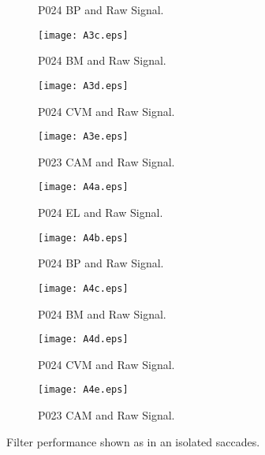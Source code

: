 \documentclass[transmag]{IEEEtran}
\begin{document}
\begin{sidewaysfigure*}
\begin{subfigure}[b]{0.18\textwidth}
		\caption{P024 BP and Raw Signal.}
	\end{subfigure}
	\begin{subfigure}[b]{0.18\textwidth}
		\texttt{[image: A3c.eps]}
		\caption{P024 BM and Raw Signal.}
	\end{subfigure}
	\begin{subfigure}[b]{0.18\textwidth}
		\texttt{[image: A3d.eps]}
		\caption{P024 CVM and Raw Signal.}
	\end{subfigure}
	\begin{subfigure}[b]{0.18\textwidth}
	\texttt{[image: A3e.eps]}
	\caption{P023 CAM and Raw Signal.}
	\end{subfigure}
	\hfill
	\begin{subfigure}[b]{0.18\textwidth}
		\texttt{[image: A4a.eps]}
		\caption{P024 EL and Raw Signal.}
	\end{subfigure}
	\begin{subfigure}[b]{0.18\textwidth}
		\texttt{[image: A4b.eps]}
		\caption{P024 BP and Raw Signal.}
	\end{subfigure}
	\begin{subfigure}[b]{0.18\textwidth}
		\texttt{[image: A4c.eps]}
		\caption{P024 BM and Raw Signal.}
	\end{subfigure}
	\begin{subfigure}[b]{0.18\textwidth}
		\texttt{[image: A4d.eps]}
		\caption{P024 CVM and Raw Signal.}
	\end{subfigure}
	\begin{subfigure}[b]{0.18\textwidth}
	\texttt{[image: A4e.eps]}
	\caption{P023 CAM and Raw Signal.}
	\end{subfigure}
	\hfill
	\caption{Filter performance shown as in an isolated saccades.}
	\label{fig10}
\end{sidewaysfigure*}
\end{document}
